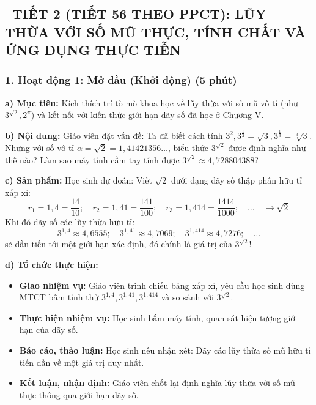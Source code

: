 \documentclass[12pt, a4paper]{article}
\begin{document}
\vspace{10pt}

\subsection*{\faClockO \ TIẾT 2 (TIẾT 56 THEO PPCT): LŨY THỪA VỚI SỐ MŨ THỰC, TÍNH CHẤT VÀ ỨNG DỤNG THỰC TIỄN}

\subsubsection*{1. Hoạt động 1: Mở đầu (Khởi động) (5 phút)}

\noindent \textbf{a) Mục tiêu:}
Kích thích trí tò mò khoa học về lũy thừa với số mũ vô tỉ (như $3^{\sqrt{2}}, 2^\pi$) và kết nối với kiến thức giới hạn dãy số đã học ở Chương V.

\noindent \textbf{b) Nội dung:}
Giáo viên đặt vấn đề:
Ta đã biết cách tính $3^2, 3^{\frac{1}{2}} = \sqrt{3}, 3^{\frac{1}{3}} = \sqrt[3]{3}$. Nhưng với số vô tỉ $\alpha = \sqrt{2} = 1{,}41421356\dots$, biểu thức $3^{\sqrt{2}}$ được định nghĩa như thế nào? Làm sao máy tính cầm tay tính được $3^{\sqrt{2}} \approx 4{,}728804388$?

\noindent \textbf{c) Sản phẩm:}
Học sinh dự đoán: Viết $\sqrt{2}$ dưới dạng dãy số thập phân hữu tỉ xấp xỉ:
$$r_1 = 1{,}4 = \dfrac{14}{10}; \quad r_2 = 1{,}41 = \dfrac{141}{100}; \quad r_3 = 1{,}414 = \dfrac{1414}{1000}; \quad \dots \quad \to \sqrt{2}$$
Khi đó dãy số các lũy thừa hữu tỉ:
$$3^{1{,}4} \approx 4{,}6555; \quad 3^{1{,}41} \approx 4{,}7069; \quad 3^{1{,}414} \approx 4{,}7276; \quad \dots$$
sẽ dần tiến tới một giới hạn xác định, đó chính là giá trị của $3^{\sqrt{2}}$!

\noindent \textbf{d) Tổ chức thực hiện:}
\begin{itemize}[leftmargin=0.6cm]
    \item \textbf{Giao nhiệm vụ:} Giáo viên trình chiếu bảng xấp xỉ, yêu cầu học sinh dùng MTCT bấm tính thử $3^{1{,}4}, 3^{1{,}41}, 3^{1{,}414}$ và so sánh với $3^{\sqrt{2}}$.
    \item \textbf{Thực hiện nhiệm vụ:} Học sinh bấm máy tính, quan sát hiện tượng giới hạn của dãy số.
    \item \textbf{Báo cáo, thảo luận:} Học sinh nêu nhận xét: Dãy các lũy thừa số mũ hữu tỉ tiến dần về một giá trị duy nhất.
    \item \textbf{Kết luận, nhận định:} Giáo viên chốt lại định nghĩa lũy thừa với số mũ thực thông qua giới hạn dãy số.
\end{itemize}
\end{document}
